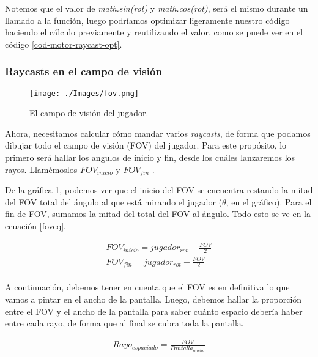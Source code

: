 Notemos que el valor de \emph{math.sin(rot)} y \emph{math.cos(rot)}, será el mismo durante un llamado a la función, luego podríamos optimizar ligeramente nuestro código haciendo el cálculo previamente y reutilizando el valor, como se puede ver en el código \ref{cod-motor-raycast-opt}.

\newpage




\newpage

\subsubsection{Raycasts en el campo de visión}

\begin{figure}[h!]
	\centering
	\texttt{[image: ./Images/fov.png]}
	\caption{El campo de visión del jugador.}
	\label{fovgraph}
\end{figure}

Ahora, necesitamos calcular cómo mandar varios \emph{raycasts}, de forma que podamos dibujar todo el campo de visión (FOV) del jugador. Para este propósito, lo primero será hallar los angulos de inicio y fin, desde los cuáles lanzaremos los rayos. Llamémoslos $FOV_{inicio}$ y $FOV_{fin}$ .

De la gráfica \ref{fovgraph}, podemos ver que el inicio del FOV se encuentra restando la mitad del FOV total del ángulo al que está mirando el jugador ($\theta$, en el gráfico). Para el fin de FOV, sumamos la mitad del total del FOV al ángulo. Todo esto se ve en la ecuación \ref{foveq}. 

\begin{equation}
\begin{aligned}
\label{foveq}
FOV_{inicio} = jugador_{rot} - \frac{FOV}{2}\\
FOV_{fin} = jugador_{rot} + \frac{FOV}{2} \\
\end{aligned}
\end{equation}

A continuación, debemos tener en cuenta que el FOV es en definitiva lo que vamos a pintar en el ancho de la pantalla. Luego, debemos hallar la proporción entre el FOV y el ancho de la pantalla para saber cuánto espacio debería haber entre cada rayo, de forma que al final se cubra toda la pantalla.

\begin{equation}
\begin{aligned}
\label{foveq}
Rayo_{espaciado} = \frac{FOV}{Pantalla_{ancho}}
\end{aligned}
\end{equation}

